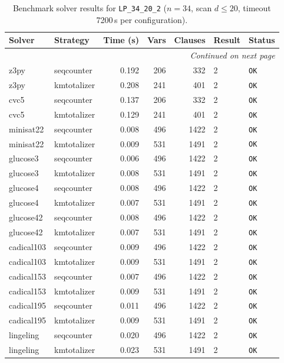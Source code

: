 \begin{longtable}{llrrrl p{}}
\caption{Benchmark solver results for \texttt{LP\_34\_20\_2} ($n=34$, scan $d \leq 20$, timeout 7200\,s per configuration).} \label{tab:bench-LP_34_20_2} \\
\toprule
Solver & Strategy & Time (s) & Vars & Clauses & Result & Status \\
\midrule
\endhead
\midrule
\multicolumn{7}{r}{\textit{Continued on next page}} \\
\midrule
\endfoot
\bottomrule
\endlastfoot
z3py & seqcounter & 0.192 & 206 & 332 & 2 & \texttt{OK} \\
z3py & kmtotalizer & 0.208 & 241 & 401 & 2 & \texttt{OK} \\
cvc5 & seqcounter & 0.137 & 206 & 332 & 2 & \texttt{OK} \\
cvc5 & kmtotalizer & 0.129 & 241 & 401 & 2 & \texttt{OK} \\
minisat22 & seqcounter & 0.008 & 496 & 1422 & 2 & \texttt{OK} \\
minisat22 & kmtotalizer & 0.009 & 531 & 1491 & 2 & \texttt{OK} \\
glucose3 & seqcounter & 0.006 & 496 & 1422 & 2 & \texttt{OK} \\
glucose3 & kmtotalizer & 0.008 & 531 & 1491 & 2 & \texttt{OK} \\
glucose4 & seqcounter & 0.008 & 496 & 1422 & 2 & \texttt{OK} \\
glucose4 & kmtotalizer & 0.007 & 531 & 1491 & 2 & \texttt{OK} \\
glucose42 & seqcounter & 0.008 & 496 & 1422 & 2 & \texttt{OK} \\
glucose42 & kmtotalizer & 0.007 & 531 & 1491 & 2 & \texttt{OK} \\
cadical103 & seqcounter & 0.009 & 496 & 1422 & 2 & \texttt{OK} \\
cadical103 & kmtotalizer & 0.009 & 531 & 1491 & 2 & \texttt{OK} \\
cadical153 & seqcounter & 0.007 & 496 & 1422 & 2 & \texttt{OK} \\
cadical153 & kmtotalizer & 0.009 & 531 & 1491 & 2 & \texttt{OK} \\
cadical195 & seqcounter & 0.011 & 496 & 1422 & 2 & \texttt{OK} \\
cadical195 & kmtotalizer & 0.009 & 531 & 1491 & 2 & \texttt{OK} \\
lingeling & seqcounter & 0.020 & 496 & 1422 & 2 & \texttt{OK} \\
lingeling & kmtotalizer & 0.023 & 531 & 1491 & 2 & \texttt{OK} \\

\end{longtable}

